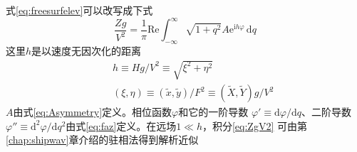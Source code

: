 式\eqref{eq:freesurfelev}可以改写成下式
\begin{equation}
  \frac{Zg}{V^2}=\frac{1}{\pi}\mathrm{Re}\int_{-\infty}^{\infty}
  \sqrt{1+q^2}A\mathrm{e}^{\mathrm{i}h\varphi}\,\mathrm{d}q
  \label{eq:ZgV2}
\end{equation}
这里$h$是以速度无因次化的距离
\begin{eqnarray}
  && h\equiv Hg/V^2\equiv \sqrt{\xi^2+\eta^2}\label{eq:h}\\
  && (\xi,\eta)\equiv (\tilde{x},\tilde{y})/F^2\equiv(\tilde{X},\tilde{Y})g/V^2
  \label{eq:xieta}
\end{eqnarray}
$A$由式\eqref{eq:Asymmetry}定义。相位函数$\varphi$和它的一阶导数
$\varphi'\equiv\mathrm{d}\varphi/\mathrm{d}q$、二阶导数$\varphi''\equiv\mathrm{d}^2\varphi/\mathrm{d}q^2$由式\eqref{eq:faz}定义。在远场$1\ll h$，积分\eqref{eq:ZgV2}
可由第\ref{chap:shipwav}章介绍的驻相法得到解析近似



